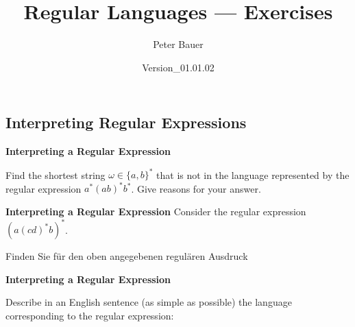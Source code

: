 \documentclass[a4paper]{exam}
\title{Regular Languages --- Exercises}
\author{Peter Bauer}
\date{Version\_01.01.02} %
\theoremstyle{remark}
\begin{document}

\begin{center} 
\end{center}

\begin{questions}
	\section{Interpreting Regular Expressions}
\question
	\textbf{Interpreting a Regular Expression}
	
	Find the shortest string $\omega \in \{a, b\}^*$ that is not in the language represented by the regular expression $a^*(ab)^*b^*$. Give
	reasons for your answer.
	
\question
	\textbf{Interpreting a Regular Expression}
	Consider the regular expression $(a(cd)^*b)^*$.
	
	\begin{otherlanguage}{german}
		Finden Sie für den oben angegebenen regulären Ausdruck
	\end{otherlanguage}
\question
	\textbf{Interpreting a Regular Expression}
	
	Describe in an English sentence (as simple as possible) the language corresponding to the regular expression:
	

\end{questions}
\end{document}
